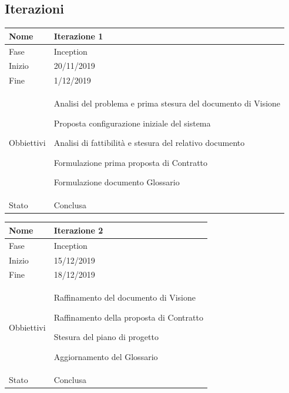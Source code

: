 \subsection{Iterazioni}

\begin{center}

\begin{tabular}{ |p{2cm}|p{10cm}|  }
\hline
Nome & Iterazione 1 \\\hline
Fase & Inception \\\hline
Inizio & 20/11/2019 \\\hline
Fine &  1/12/2019 \\\hline
Obbiettivi & 
	\begin{compactitem}
		\item Analisi del problema e prima stesura del documento di Visione
		\item Proposta configurazione iniziale del sistema
		\item Analisi di fattibilità e stesura del relativo documento
		\item Formulazione prima proposta di Contratto
		\item Formulazione documento Glossario
	\end{compactitem}\\\hline
Stato &  Conclusa \\\hline
\end{tabular}
\label{table:1}\newline

\begin{tabular}{ |p{2cm}|p{10cm}|  }
\hline
Nome & Iterazione 2 \\\hline
Fase & Inception \\\hline
Inizio & 15/12/2019 \\\hline
Fine &  18/12/2019 \\\hline
Obbiettivi & 
	\begin{compactitem}
		\item Raffinamento del documento di Visione
		\item Raffinamento della proposta di Contratto
		\item Stesura del piano di progetto
		\item Aggiornamento del Glossario
	\end{compactitem}\\\hline
Stato &  Conclusa \\\hline
\end{tabular}
\label{table:2}\newline


\end{center}
